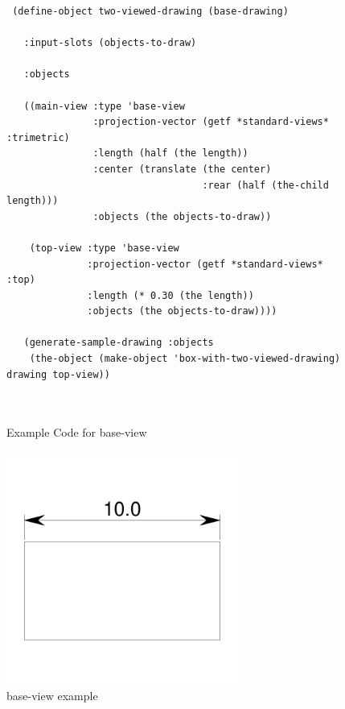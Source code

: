 \documentclass [11pt]{book}
\begin{document}
\begin{itemize}
\begin{figure}
\begin{lrbox}{\boxedverb}
\begin{minipage}{\linewidth}
{\begin{verbatim}
 (define-object two-viewed-drawing (base-drawing)
   
   :input-slots (objects-to-draw)
   
   :objects
  
   ((main-view :type 'base-view
               :projection-vector (getf *standard-views* :trimetric)
               :length (half (the length))
               :center (translate (the center)
                                  :rear (half (the-child length)))
               :objects (the objects-to-draw))
   
    (top-view :type 'base-view
              :projection-vector (getf *standard-views* :top)
              :length (* 0.30 (the length))
              :objects (the objects-to-draw))))

   (generate-sample-drawing :objects 
    (the-object (make-object 'box-with-two-viewed-drawing) drawing top-view))
 
 
\end{verbatim}}
\end{minipage}
\end{lrbox}
\fbox{\usebox{\boxedverb}}

\caption{Example Code for base-view}

\label{fig:example-code-base-view}

\end{figure}

\begin{figure}
\begin{center}
\includegraphics[width=3in,height=3in]{../images/example-base-view.pdf}
\end{center}

\caption{base-view example}

\label{fig:base-view}

\end{figure}






\end{itemize}
\end{document}
